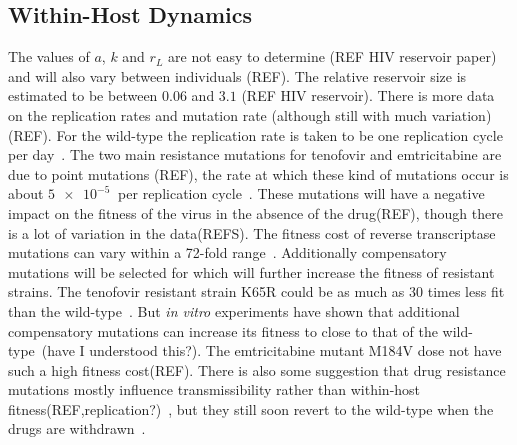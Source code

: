 \documentclass[DIV=15]{scrartcl}
\begin{document}
  
  \subsection{Within-Host Dynamics}
  



  The values of $a$, $k$ and $r_L$ are not easy to determine (REF HIV reservoir paper) and will also vary between individuals (REF). The relative reservoir size is estimated to be between $0.06$ and $3.1$ (REF HIV reservoir). There is more data on the replication rates and mutation rate (although still with much variation) (REF). For the wild-type the replication rate is taken to  be one replication cycle  per day~\cite{perelson1996}.  The two main resistance mutations for tenofovir and  emtricitabine are due to point mutations (REF), the rate at which these kind of mutations occur is about $\SI{5e-5}{}$ per replication cycle~\cite{gao2004,cuevas2015,abram2010}. These mutations will have a negative impact on the fitness of the virus in the absence of the drug(REF), though there is a lot of variation in the data(REFS). The fitness cost of reverse transcriptase mutations can vary within a 72-fold range~\cite{cong2007}. 
 Additionally compensatory mutations will  be selected for which will further increase the fitness of resistant strains. The tenofovir resistant strain K65R could be as much as $30$ times less fit than the wild-type~\cite{cong2007}. But \textit{in vitro} experiments have shown that additional compensatory mutations can increase its fitness to close to that of the wild-type~\cite{svarovskaia2008}(have I understood this?). The emtricitabine mutant M184V
dose not have such a high fitness cost(REF). There is also some suggestion that drug resistance mutations mostly influence transmissibility rather than within-host fitness(REF,replication?)~\cite{drams}, but they still soon revert to the wild-type when the drugs are withdrawn~\cite{chateau2013}.

\end{document}
